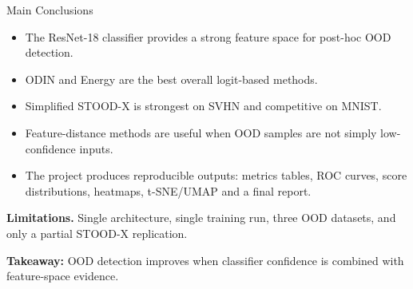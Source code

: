 \documentclass[10pt,aspectratio=169]{beamer}
\begin{document}
\begin{frame}{Main Conclusions}
  \begin{itemize}
    \item The ResNet-18 classifier provides a strong feature space for post-hoc OOD detection.
    \item ODIN and Energy are the best overall logit-based methods.
    \item Simplified STOOD-X is strongest on SVHN and competitive on MNIST.
    \item Feature-distance methods are useful when OOD samples are not simply low-confidence inputs.
    \item The project produces reproducible outputs: metrics tables, ROC curves, score distributions, heatmaps, t-SNE/UMAP and a final report.
  \end{itemize}

  \vspace{0.9em}
  \textbf{Limitations.} Single architecture, single training run, three OOD datasets, and only a partial STOOD-X replication.

  \vspace{0.7em}
  \centering
  \textbf{Takeaway:} OOD detection improves when classifier confidence is combined with feature-space evidence.
\end{frame}
\end{document}
